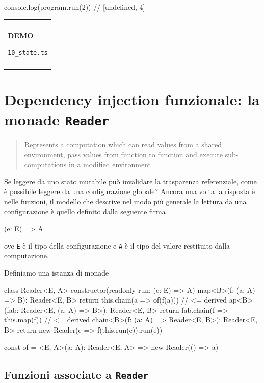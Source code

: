\documentclass[12pt]{article}
\theoremstyle{definition}
\newenvironment{demo}
    {\begin{center}
    \begin{tabular}{|p{0.9\textwidth}|}
    \hline\\
    }
    {
    \\\\\hline
    \end{tabular}
    \end{center}
    }
\newenvironment{code}
  {\vspace{0.5cm} \VerbatimEnvironment\begin{typescriptcode}}
  {\end{typescriptcode} \vspace{0.2cm}}
\begin{document}
\begin{code}
console.log(program.run(2)) // [undefined, 4]
\end{code}

\begin{demo}
\begin{center}
\textbf{DEMO}

\texttt{10\_state.ts}
\end{center}
\end{demo}

\newpage

\section{Dependency injection funzionale: la monade \texttt{Reader}}

\begin{quote}
Represents a computation which can read values from a shared environment, pass values from function to function
and execute sub-computations in a modified environment
\end{quote}

Se leggere da uno stato mutabile può invalidare la trasparenza referenziale, come è possibile leggere da una configurazione globale?
Ancora una volta la risposta è nelle funzioni, il modello che descrive nel modo più generale la lettura da una configurazione
è quello definito dalla seguente firma

\begin{code}
(e: E) => A
\end{code}

ove \texttt{E} è il tipo della configurazione e \texttt{A} è il tipo del valore restituito dalla computazione.

Definiamo una istanza di monade

\begin{code}
class Reader<E, A> {
  constructor(readonly run: (e: E) => A) {}
  map<B>(f: (a: A) => B): Reader<E, B> {
    return this.chain(a => of(f(a))) // <= derived
  }
  ap<B>(fab: Reader<E, (a: A) => B>): Reader<E, B> {
    return fab.chain(f => this.map(f)) // <= derived
  }
  chain<B>(f: (a: A) => Reader<E, B>): Reader<E, B> {
    return new Reader(e => f(this.run(e)).run(e))
  }
}

const of = <E, A>(a: A): Reader<E, A> =>
  new Reader(() => a)
\end{code}

\subsection{Funzioni associate a \texttt{Reader}}
\end{document}
